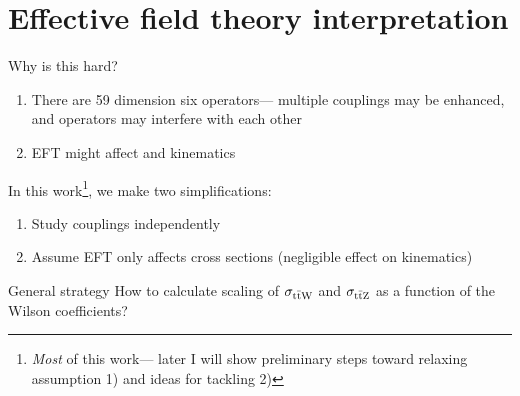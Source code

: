 \documentclass[professionalfont,fleqn]{beamer}
\DeclarePairedDelimiter{\abs}{\lvert}{\rvert}
\begin{document}
\section{Effective field theory interpretation}

\begin{frame}{Why is this hard?}
  \begin{enumerate}
    \item There are 59 dimension six operators--- multiple couplings may be enhanced, and operators may interfere with each other
    \item EFT might affect \ttW and \ttZ kinematics
  \end{enumerate}

  In this work\footnote{\emph{Most} of this work--- later I will show preliminary steps toward relaxing assumption 1) and ideas for tackling 2)}, we make two simplifications:
  \begin{enumerate}
    \item Study couplings independently
    \item Assume EFT only affects cross sections (negligible effect on kinematics)
  \end{enumerate}
\end{frame}

\begin{frame}{General strategy}
  How to calculate scaling of $\sigma_{\text{t}\bar{\text{t}}\text{W}}$ and $\sigma_{\text{t}\bar{\text{t}}\text{Z}}$ as a function of the Wilson coefficients?
  \centering
  \begin{overlayarea}{\textwidth}{6cm}
  \end{overlayarea}
\end{frame}
\end{document}
